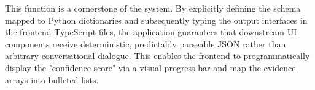 This function is a cornerstone of the system. By explicitly defining the schema mapped to Python dictionaries and subsequently typing the output interfaces in the frontend TypeScript files, the application guarantees that downstream UI components receive deterministic, predictably parseable JSON rather than arbitrary conversational dialogue. This enables the frontend to programmatically display the "confidence score" via a visual progress bar and map the evidence arrays into bulleted lists.
